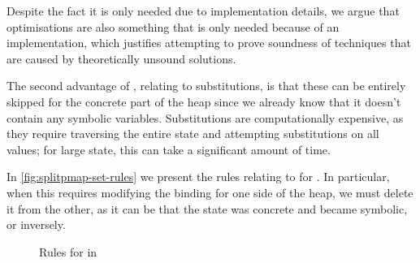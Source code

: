 Despite the fact it is only needed due to implementation details, we argue that optimisations are also something that is only needed because of an implementation, which justifies attempting to prove soundness of techniques that are caused by theoretically unsound solutions.

The second advantage of \SplitPMap{}, relating to substitutions, is that these can be entirely skipped for the concrete part of the heap since we already know that it doesn't contain any symbolic variables. Substitutions are computationally expensive, as they require traversing the entire state and attempting substitutions on all values; for large state, this can take a significant amount of time.

In \autoref{fig:splitpmap-set-rules} we present the rules relating to  for \SplitPMap. In particular, when this requires modifying the binding for one side of the heap, we must delete it from the other, as it can be that the state was concrete and became symbolic, or inversely.

\begin{figure}
	\centering
{}
\caption{Rules for  in \SplitPMap}
\label{fig:splitpmap-set-rules}
\end{figure}

